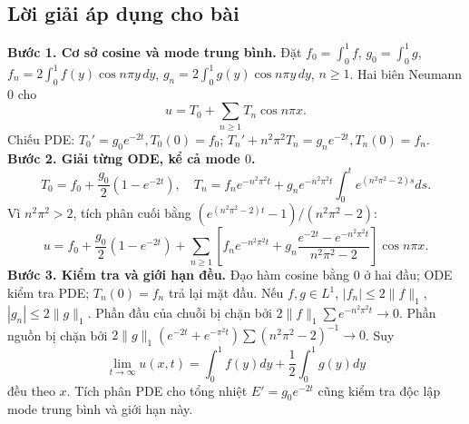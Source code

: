 \documentclass[10pt,a4paper]{article}
\begin{document}
\subsection*{Lời giải áp dụng cho bài}
\textbf{Bước 1. Cơ sở cosine và mode trung bình.}
Đặt $f_0=\int_0^1f$, $g_0=\int_0^1g$, $f_n=2\int_0^1f(y)\cos n\pi y\,dy$, $g_n=2\int_0^1g(y)\cos n\pi y\,dy$, $n\ge1$. Hai biên Neumann $0$ cho
\[u=T_0+\sum_{n\ge1}T_n\cos n\pi x.\]
Chiếu PDE: $T_0'=g_0e^{-2t},T_0(0)=f_0$; $T_n'+n^2\pi^2T_n=g_ne^{-2t},T_n(0)=f_n$.
\textbf{Bước 2. Giải từng ODE, kể cả mode $0$.}
\[T_0=f_0+\frac{g_0}2(1-e^{-2t}),\quad
T_n=f_ne^{-n^2\pi^2t}+g_ne^{-n^2\pi^2t}
\int_0^te^{(n^2\pi^2-2)s}ds.\]
Vì $n^2\pi^2>2$, tích phân cuối bằng $(e^{(n^2\pi^2-2)t}-1)/(n^2\pi^2-2)$:
\[u=f_0+\frac{g_0}2(1-e^{-2t})+
\sum_{n\ge1}\left[f_ne^{-n^2\pi^2t}
+g_n\frac{e^{-2t}-e^{-n^2\pi^2t}}{n^2\pi^2-2}\right]\cos n\pi x.\]
\textbf{Bước 3. Kiểm tra và giới hạn đều.}
Đạo hàm cosine bằng $0$ ở hai đầu; ODE kiểm tra PDE; $T_n(0)=f_n$ trả lại mặt đầu. Nếu $f,g\in L^1$, $|f_n|\le2\|f\|_1$, $|g_n|\le2\|g\|_1$. Phần đầu của chuỗi bị chặn bởi $2\|f\|_1\sum e^{-n^2\pi^2t}\to0$. Phần nguồn bị chặn bởi $2\|g\|_1(e^{-2t}+e^{-\pi^2t})\sum(n^2\pi^2-2)^{-1}\to0$. Suy
\[\lim_{t\to\infty}u(x,t)=\int_0^1f(y)dy+\frac12\int_0^1g(y)dy\]
đều theo $x$. Tích phân PDE cho tổng nhiệt $E'=g_0e^{-2t}$ cũng kiểm tra độc lập mode trung bình và giới hạn này.
\end{document}

